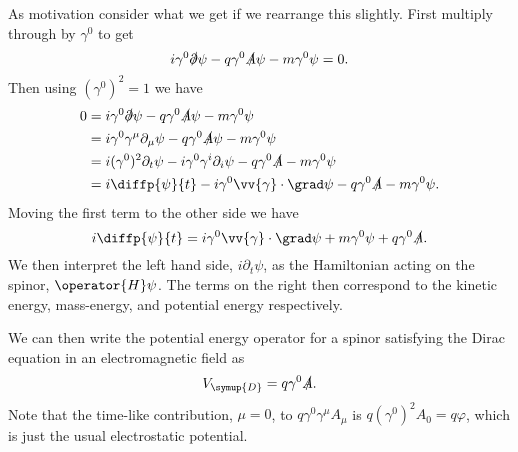 \documentclass[fleqn]{NotesClass}
\newcommand{\dirac}{\symup{D}}
\begin{document}
    As motivation consider what we get if we rearrange this slightly.
    First multiply through by \(\gamma^0\) to get
    \begin{equation}
        i\gamma^0 \slashed{\partial}\psi - q\gamma^0\slashed{A}\psi - m\gamma^0\psi = 0.
    \end{equation}
    Then using \((\gamma^0)^2 = 1\) we have
    \begin{align}
        0 &= i\gamma^0\slashed{\partial}\psi - q\gamma^0\slashed{A}\psi - m\gamma^0\psi\\
        &= i\gamma^0\gamma^\mu\partial_\mu\psi - q\gamma^0\slashed{A}\psi - m\gamma^0\psi\\
        &= i(\gamma^0)^2\partial_t\psi - i\gamma^0\gamma^i\partial_i\psi - q\gamma^0\slashed{A} - m\gamma^0\psi\\
        &= i\diffp{\psi}{t} - i\gamma^0\vv{\gamma} \cdot \grad\psi - q\gamma^0 \slashed{A} - m\gamma^0\psi.
    \end{align}
    Moving the first term to the other side we have
    \begin{equation}
        i\diffp{\psi}{t} = i\gamma^0\vv{\gamma} \cdot \grad \psi + m\gamma^0\psi + q\gamma^0\slashed{A}.
    \end{equation}
    We then interpret the left hand side, \(i\partial_t \psi\), as the Hamiltonian acting on the spinor, \(\operator{H}\psi\).
    The terms on the right then correspond to the kinetic energy, mass-energy, and potential energy respectively.
    
    We can then write the potential energy operator for a spinor satisfying the Dirac equation in an electromagnetic field as
    \begin{equation}
        V_{\dirac} = q \gamma^0\slashed{A}.
    \end{equation}
    Note that the time-like contribution, \(\mu = 0\), to \(q\gamma^0\gamma^\mu A_\mu\) is \(q(\gamma^0)^2A_0 = q\varphi\), which is just the usual electrostatic potential.
    
\end{document}
